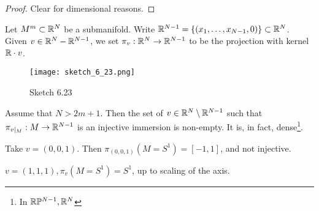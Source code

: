 \begin{proof}
    Clear for dimensional reasons.
\end{proof}

\begin{corollary}\label{cor:6.11}
    Let \(M^m\subset \mathbb{R}^N\) be a submanifold. Write \(\mathbb{R}^{N-1}=\{(x_1,\dots,x_{N-1},0)\}\subset\mathbb{R}^N\).
    Given \(v\in\mathbb{R}^{N}-\mathbb{R}^{N-1}\), we set \(\pi_v:\mathbb{R}^N\to\mathbb{R}^{N-1}\) to be the projection with kernel \(\mathbb{R}\cdot v\).
    \begin{figure}[H]\label{fig:6.23}
        \centering
        \texttt{[image: sketch\_6\_23.png]}
        \caption{Sketch 6.23}
    \end{figure}
    Assume that \(N>2m+1\). Then the set of \(v\in\mathbb{R}^{N}\setminus\mathbb{R}^{N-1}\) such that \(\pi_{v\mid_M}:M\to\mathbb{R}^{N-1}\)
    is an injective immersion is non-empty. It is, in fact, dense\footnote{In \(\mathbb{R}\mathbb{P}^{N-1}, \mathbb{R}^{N}\)}.

\end{corollary}

\begin{example}
    Take \(v=(0,0,1)\). Then \(\pi_{(0,0,1)}(M=S^1)=[-1,1]\), and not injective.
\end{example}

\begin{example}
    \(v=(1,1,1),\pi_v(M=S^1)=S^1\), up to scaling of the axis. %
\end{example}

